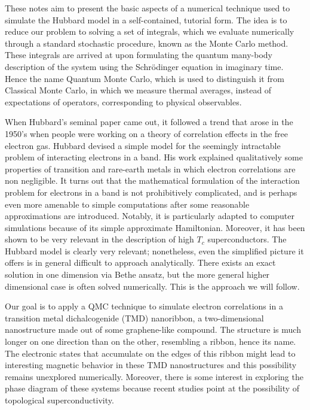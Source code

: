 \documentclass[10pt, twocolumn, twoside]{article}
\begin{document}
These notes aim to present the basic aspects of a numerical technique used to simulate the Hubbard model in a self-contained, tutorial form. The idea is to reduce our problem to solving a set of integrals, which we evaluate numerically through a standard stochastic procedure, known as the Monte Carlo method. These integrals are arrived at upon formulating the quantum many-body description of the system using the Schr\"odinger equation in imaginary time. Hence the name Quantum Monte Carlo, which is used to distinguish it from Classical Monte Carlo, in which we measure thermal averages, instead of expectations of operators, corresponding to physical observables.

When Hubbard's seminal paper came out, it followed a trend that arose in the 1950's when people were working on a theory of correlation effects in the free electron gas. Hubbard devised a simple model for the seemingly intractable problem of interacting electrons in a band. His work explained qualitatively some properties of transition and rare-earth metals in which electron correlations are non negligible. It turns out that the mathematical formulation of the interaction problem for electrons in a band is not prohibitively complicated, and is perhaps even more amenable to simple computations after some reasonable approximations are introduced. Notably, it is particularly adapted to computer simulations because of its simple approximate Hamiltonian. Moreover, it has been shown to be very relevant in the description of high $T_c$ superconductors. The Hubbard model is clearly very relevant; nonetheless, even the simplified picture it offers is in general difficult to approach analytically. There exists an exact solution in one dimension via Bethe ansatz, but the more general higher dimensional case is often solved numerically. This is the approach we will follow.

Our goal is to apply a QMC technique to simulate electron correlations in a transition metal dichalcogenide (TMD) nanoribbon, a two-dimensional nanostructure made out of some graphene-like compound. The structure is much longer on one direction than on the other, resembling a ribbon, hence its name. The electronic states that accumulate on the edges of this ribbon might lead to interesting magnetic behavior in these TMD nanostructures and this possibility remains unexplored numerically. Moreover, there is some interest in exploring the phase diagram of these systems because recent studies point at the possibility of topological superconductivity.
\end{document}
